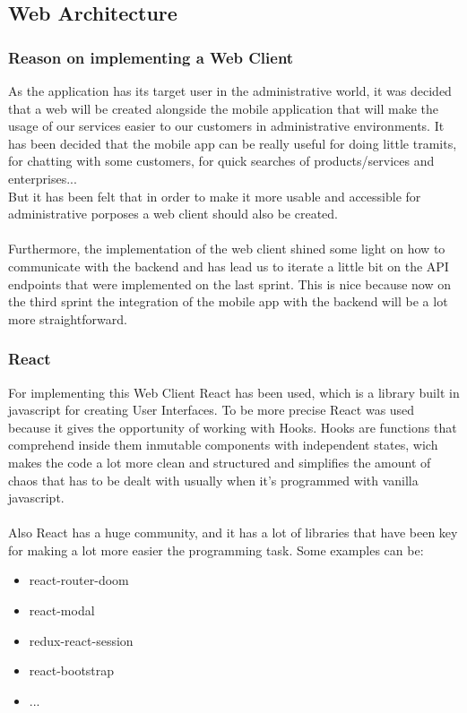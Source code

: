 \documentclass[./main.tex]{subfiles}
\begin{document}
\subsection{Web Architecture}
\subsubsection{Reason on implementing a Web Client}
As the application has its target user in the 
administrative world, it was decided that 
a web will be created alongside the mobile application that will
make the usage of our services easier to our customers
in administrative environments. It has been decided that the 
mobile app can be really useful for doing little 
tramits, for chatting with some customers, for 
quick searches of products/services and enterprises...\\
But it has been felt that in order to make it more usable and
accessible for administrative porposes a web client
should also be created.
\\\\
Furthermore, the implementation of the web client 
shined some light on how to communicate with the backend
and has lead us to iterate a little bit on the API endpoints
that were implemented on the last sprint. This is nice because now
on the third sprint the integration of the mobile app with the 
backend will be a lot more straightforward.
\subsubsection{React}
For implementing this Web Client React has been used, which is a 
library built in javascript for creating User Interfaces. 
To be more precise React was used because it gives the opportunity
of working with Hooks. Hooks are functions that comprehend inside them inmutable
components with independent states, wich makes the code a lot more
clean and structured and simplifies the amount of chaos that has
to be dealt with usually when it's programmed with vanilla javascript.
\\\\
Also React has a huge community, and it has a lot of libraries that
have been key for making a lot more easier the programming task.
Some examples can be:
\begin{itemize}
	\item react-router-doom
	\item react-modal
	\item redux-react-session
	\item react-bootstrap
	\item ...
\end{itemize}
\end{document}

